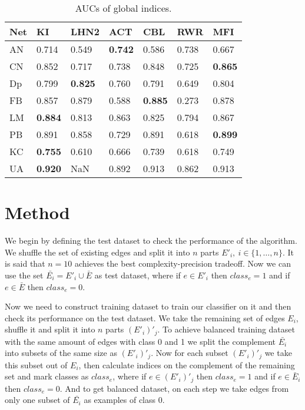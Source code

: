 \documentclass{llncs}
\begin{document}
%
\setlength{\tabcolsep}{5pt}
\renewcommand{\arraystretch}{1.5}
\begin{table}
\begin{center}
\caption{AUCs of global indices.}
\begin{tabular}{| l | l | l | l | l | l | l |}
\hline
Net & KI & LHN2 & ACT & CBL & RWR & MFI \\ \hline
AN & 0.714 & 0.549 & \textbf{0.742} & 0.586 & 0.738 & 0.667 \\ \hline
CN & 0.852 & 0.717 & 0.738 & 0.848 & 0.725 & \textbf{0.865} \\ \hline
Dp & 0.799 & \textbf{0.825} & 0.760 & 0.791 & 0.649 & 0.804 \\ \hline
FB & 0.857 & 0.879 & 0.588 & \textbf{0.885} & 0.273 & 0.878 \\ \hline
LM & \textbf{0.884} & 0.813 & 0.863 & 0.825 & 0.794 & 0.867 \\ \hline
PB & 0.891 & 0.858 & 0.729 & 0.891 & 0.618 & \textbf{0.899} \\ \hline
KC & \textbf{0.755} & 0.610 & 0.666 & 0.739 & 0.618 & 0.749 \\ \hline
UA & \textbf{0.920} & NaN & 0.892 & 0.913 & 0.862 & 0.913 \\ 
\hline
\end{tabular}
\end{center}
\end{table}
%
\section{Method}
%
We begin by defining the test dataset to check the performance of the algorithm. We shuffle the set of existing edges and split it into $n$ parts $E'_i, \ i \in \{1, \ldots, n\}$. It is said that $n = 10$ achieves the best complexity-precision tradeoff. Now we can use the set $\bar{E_i} = E'_i \cup \bar{E}$ as test dataset, where if $e \in E'_i$ then $class_e = 1$ and if $e \in \bar{E}$ then $class_e = 0$.

Now we need to construct training dataset to train our classifier on it and then check its performance on the test dataset. We take the remaining set of edges $E_i$, shuffle it and split it into $n$ parts $(E'_i)'_j$. To achieve balanced training dataset with the same amount of edges with class 0 and 1 we split the complement $\bar{E_i}$ into subsets of the same size as $(E'_i)'_j$. Now for each subset $(E'_i)'_j$ we take this subset out of $E_i$, then calculate indices on the complement of the remaining set and mark classes as $class_e$, where if $e \in (E'_i)'_j$ then $class_e = 1$ and if $e \in \bar{E}_i$ then $class_e = 0$. And to get balanced dataset, on each step we take edges from only one subset of $\bar{E_i}$ as examples of class 0.
\end{document}
